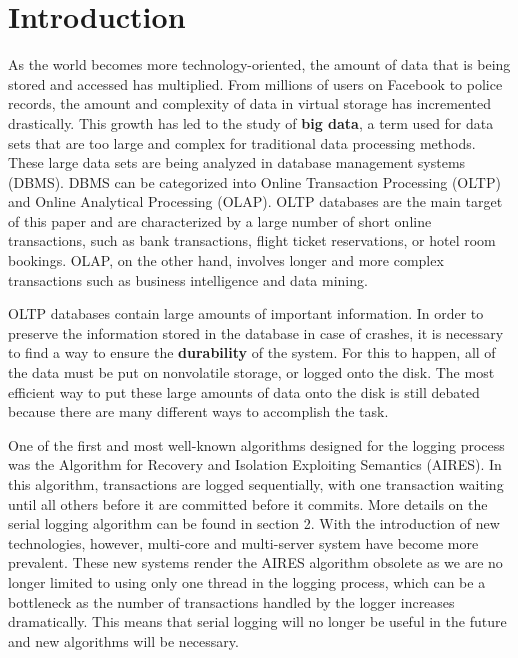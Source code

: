 \section{Introduction}

As the world becomes more technology-oriented, the amount of data that is being stored and accessed has multiplied. From millions of users on Facebook to police records, the amount and complexity of data in virtual storage has incremented drastically. This growth has led to the study of \textbf{big data}, a term used for data sets that are too large and complex for traditional data processing methods. These large data sets are being analyzed in database management systems (DBMS). DBMS can be categorized into Online Transaction Processing (OLTP) and Online Analytical Processing (OLAP). OLTP databases are the main target of this paper and are characterized by a large number of short online transactions, such as bank transactions, flight ticket reservations, or hotel room bookings. OLAP, on the other hand, involves longer and more complex transactions such as business intelligence and data mining. \par

OLTP databases contain large amounts of important information. In order to preserve the information stored in the database in case of crashes, it is necessary to find a way to ensure the \textbf{durability} of the system. For this to happen, all of the data must be put on nonvolatile storage, or logged onto the disk. The most efficient way to put these large amounts of data onto the disk is still debated because there are many different ways to accomplish the task. \par

One of the first and most well-known algorithms designed for the logging process was the Algorithm for Recovery and Isolation Exploiting Semantics (AIRES). In this algorithm, transactions are logged sequentially, with one transaction waiting until all others before it are committed before it commits. More details on the serial logging algorithm can be found in section 2. With the introduction of new technologies, however, multi-core and multi-server system have become more prevalent. These new systems render the AIRES algorithm obsolete as we are no longer limited to using only one thread in the logging process, which can be a bottleneck as the number of transactions handled by the logger increases dramatically. This means that serial logging will no longer be useful in the future and new algorithms will be necessary.  \par


